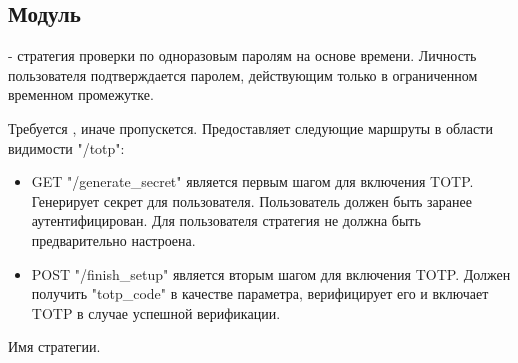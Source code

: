 \subsection{Модуль }\label{page-FPauth-strategies-module-FPauth+u+strategies-module-TOTP}%
 - стратегия проверки по одноразовым паролям на основе времени. Личность пользователя подтверждается паролем, действующим только в ограниченном временном промежутке.

Требуется , иначе пропускется. Предоставляет следующие маршруты в области видимости "/totp":

\begin{itemize}\item{GET "/generate\_secret" является первым шагом для включения TOTP. Генерирует секрет для пользователя. Пользователь должен быть заранее аутентифицирован. Для пользователя стратегия не должна быть предварительно настроена.}%
\item{POST "/finish\_setup" является вторым шагом для включения TOTP. Должен получить "totp\_code" в качестве параметра, верифицирует его и включает TOTP в случае успешной верификации.}\end{itemize}%
\label{page-FPauth-strategies-module-FPauth+u+strategies-module-TOTP-val-name}\begin{ocamlindent}Имя стратегии.\end{ocamlindent}%
\medbreak
